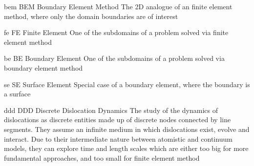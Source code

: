\newdualentry
{bem}
{BEM}
{Boundary Element Method}
{The 2D analogue of an finite element method, where only the domain boundaries are of interest}

\newdualentry
{fe}
{FE}
{Finite Element}
{One of the subdomains of a problem solved via finite element method}

\newdualentry
{be}
{BE}
{Boundary Element}
{One of the subdomains of a problem solved via boundary element method}

\newdualentry
{se}
{SE}
{Surface Element}
{Special case of a boundary element, where the boundary is a surface}

\newdualentry
{ddd}
{DDD}
{Discrete Dislocation Dynamics}
{The study of the dynamics of dislocations as discrete entities made up of discrete nodes connected by line segments. They assume an infinite medium in which dislocations exist, evolve and interact. Due to their intermediate nature between atomistic and continuum models, they can explore time and length scales which are either too big for more fundamental approaches, and too small for finite element method}